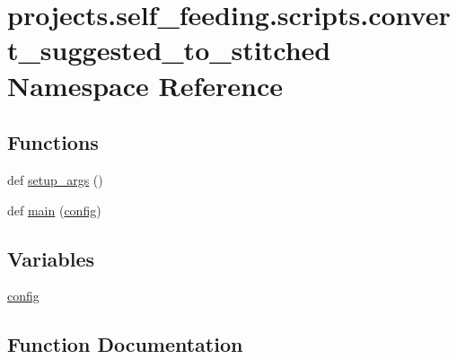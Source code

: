 \hypertarget{namespaceprojects_1_1self__feeding_1_1scripts_1_1convert__suggested__to__stitched}{}\section{projects.\+self\+\_\+feeding.\+scripts.\+convert\+\_\+suggested\+\_\+to\+\_\+stitched Namespace Reference}
\label{namespaceprojects_1_1self__feeding_1_1scripts_1_1convert__suggested__to__stitched}
\subsection*{Functions}
\begin{DoxyCompactItemize}
\item 
def \hyperlink{namespaceprojects_1_1self__feeding_1_1scripts_1_1convert__suggested__to__stitched_abb3be1e61354f80ddbc5d87ffe42e518}{setup\+\_\+args} ()
\item 
def \hyperlink{namespaceprojects_1_1self__feeding_1_1scripts_1_1convert__suggested__to__stitched_a6616af45a9b73cd0314c3d585d66d5f8}{main} (\hyperlink{namespaceprojects_1_1self__feeding_1_1scripts_1_1convert__suggested__to__stitched_a04b120384976c805efcd721f6b8acb24}{config})
\end{DoxyCompactItemize}
\subsection*{Variables}
\begin{DoxyCompactItemize}
\item 
\hyperlink{namespaceprojects_1_1self__feeding_1_1scripts_1_1convert__suggested__to__stitched_a04b120384976c805efcd721f6b8acb24}{config}
\end{DoxyCompactItemize}


\subsection{Function Documentation}
\mbox{\label{namespaceprojects_1_1self__feeding_1_1scripts_1_1convert__suggested__to__stitched_a6616af45a9b73cd0314c3d585d66d5f8}} 
